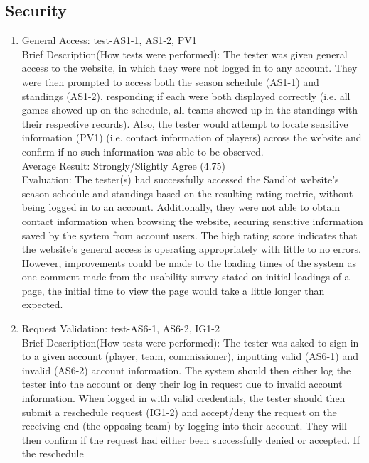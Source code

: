 \documentclass[12pt, titlepage]{article}
\begin{document}
\subsection{Security}

\begin{enumerate}
  \item{General Access: test-AS1-1, AS1-2, PV1\\}
  Brief Description(How tests were performed): The tester was given general access to the
  website, in which they were not logged in to any account. They were then prompted to
  access both the season schedule (AS1-1) and standings (AS1-2), responding if each
  were both displayed correctly (i.e. all games showed up on the schedule, all teams
  showed up in the standings with their respective records). Also, the tester would attempt
  to locate sensitive information (PV1) (i.e. contact information of players) across the
  website and confirm if no such information was able to be observed. \\
  Average Result: Strongly/Slightly Agree (4.75)\\
  Evaluation: The tester(s) had successfully accessed the Sandlot website's season schedule and
  standings based on the resulting rating metric, without being logged in to an account. Additionally,
  they were not able to obtain contact information when browsing the website, securing sensitive
  information saved by the system from account users. The high rating score indicates that the
  website's general access is operating appropriately with little to no errors. However,
  improvements could be made to the loading times of the system as one comment made from the
  usability survey stated on initial loadings of a page, the initial time to view the page would
  take a little longer than expected.
  \item{Request Validation: test-AS6-1, AS6-2, IG1-2\\}
  Brief Description(How tests were performed): The tester was asked to sign in to a given
  account (player, team, commissioner), inputting valid (AS6-1) and invalid (AS6-2)
  account information. The system should then either log the tester into the account or
  deny their log in request due to invalid account information. When logged in with valid
  credentials, the tester should then submit a reschedule request (IG1-2) and accept/deny the
  request on the receiving end (the opposing team) by logging into their account. They will then
  confirm if the request had either been successfully denied or accepted. If the reschedule

\end{enumerate}
\end{document}
